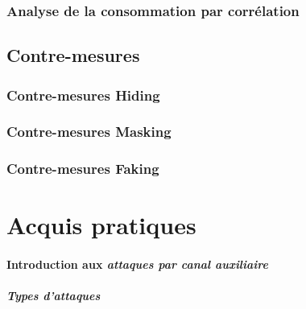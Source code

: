\documentclass[oneside]{book}
\begin{document}
\section{Analyse de la consommation par corrélation}
\label{sec:Introduction}

\newpage


\chapter{Contre-mesures}

\section{Contre-mesures Hiding}
\label{sec:Introduction}

\section{Contre-mesures Masking}
\label{sec:Introduction}

\section{Contre-mesures Faking}
\label{sec:Introduction}

\newpage



\part{Acquis pratiques}


\subsection{Introduction aux \textit{attaques par canal auxiliaire}}
\label{sec:att}
\subsubsection{Types d'attaques}
\end{document}
